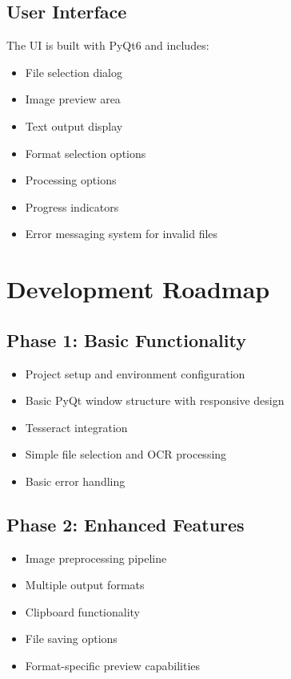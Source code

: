 \documentclass[12pt]{article}
\begin{document}
\subsection{User Interface}
The UI is built with PyQt6 and includes:
\begin{itemize}
    \item File selection dialog
    \item Image preview area
    \item Text output display
    \item Format selection options
    \item Processing options
    \item Progress indicators
    \item Error messaging system for invalid files
\end{itemize}

\section{Development Roadmap}

\subsection{Phase 1: Basic Functionality}
\begin{itemize}
    \item Project setup and environment configuration
    \item Basic PyQt window structure with responsive design
    \item Tesseract integration
    \item Simple file selection and OCR processing
    \item Basic error handling
\end{itemize}

\subsection{Phase 2: Enhanced Features}
\begin{itemize}
    \item Image preprocessing pipeline
    \item Multiple output formats
    \item Clipboard functionality
    \item File saving options
    \item Format-specific preview capabilities
\end{itemize}
\end{document}
